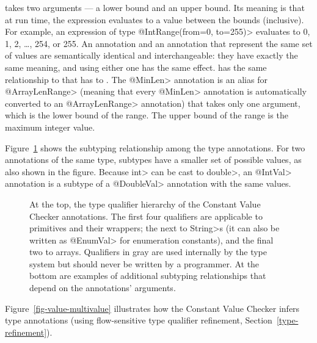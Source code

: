 
 takes two arguments --- a lower
bound and an upper bound.  Its meaning is that at run time, the expression
evaluates to a value between the bounds (inclusive).  For example, an
expression of type \<@IntRange(from=0, to=255)> evaluates to
0, 1, 2, \ldots, 254, or 255.
An  annotation and an
 annotation that represent the
same set of values are semantically identical and interchangeable:  they
have exactly the same meaning, and using either one has the same effect.
 has the same relationship
to  that
 has to
.
The \<@MinLen> annotation is an alias for \<@ArrayLenRange> (meaning that every \<@MinLen> annotation
 is automatically converted to an \<@ArrayLenRange> annotation) that takes only
one argument, which is the lower bound of the range. The upper bound of the
range is the maximum integer value.

Figure~\ref{fig-value-hierarchy} shows the
subtyping relationship among the type annotations.
For two annotations of the same type, subtypes have a smaller set of
possible values, as also shown in the figure.
Because \<int> can be cast to \<double>, an \<@IntVal> annotation is a
subtype of a \<@DoubleVal> annotation with the same values.

\begin{figure}
\caption{At the top, the type qualifier hierarchy of the Constant Value Checker
  annotations.
  The first four qualifiers are applicable to primitives and their
  wrappers; the next to \<String>s (it can also be written as \<@EnumVal> for
  enumeration constants), and the final two to arrays.
Qualifiers in gray are used
internally by the type system but should never be written by a
programmer.  At the bottom are examples of additional subtyping
relationships that depend on the annotations' arguments.}
\label{fig-value-hierarchy}
\end{figure}

Figure~\ref{fig-value-multivalue} illustrates how the Constant Value Checker
infers type annotations (using flow-sensitive type qualifier refinement, Section~\ref{type-refinement}).

